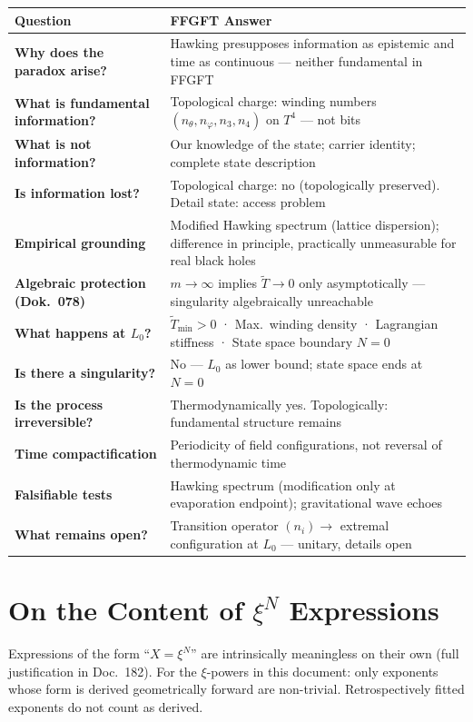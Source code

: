 \begin{longtable}{>{\bfseries}p{6cm} p{8cm}}
\toprule
Question & FFGFT Answer \\
\midrule
Why does the paradox arise? & Hawking presupposes information as epistemic and time as continuous --- neither fundamental in FFGFT \\
What is fundamental information? & Topological charge: winding numbers $(n_\theta, n_\varphi, n_3, n_4)$ on $T^4$ --- not bits \\
What is not information? & Our knowledge of the state; carrier identity; complete state description \\
Is information lost? & Topological charge: no (topologically preserved). Detail state: access problem \\
Empirical grounding & Modified Hawking spectrum (lattice dispersion); difference in principle, practically unmeasurable for real black holes \\
Algebraic protection (Dok.~078) & $m \rightarrow \infty$ implies $\tilde{T} \rightarrow 0$ only asymptotically --- singularity algebraically unreachable \\
What happens at $L_0$? & $\tilde{T}_\text{min} > 0$ · Max.\ winding density · Lagrangian stiffness · State space boundary $N=0$ \\
Is there a singularity? & No --- $L_0$ as lower bound; state space ends at $N = 0$ \\
Is the process irreversible? & Thermodynamically yes. Topologically: fundamental structure remains \\
Time compactification & Periodicity of field configurations, not reversal of thermodynamic time \\
Falsifiable tests & Hawking spectrum (modification only at evaporation endpoint); gravitational wave echoes \\
What remains open? & Transition operator $(n_i) \rightarrow$ extremal configuration at $L_0$ --- unitary, details open \\
\bottomrule
\end{longtable}

\section*{On the Content of $\xi^N$ Expressions}

Expressions of the form ``$X = \xi^N$'' are intrinsically meaningless on their
own (full justification in Doc.~182).
For the $\xi$-powers in this document: only exponents whose
form is derived geometrically forward are non-trivial. Retrospectively fitted
exponents do not count as derived.


